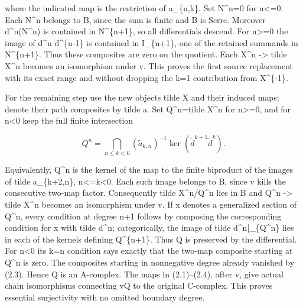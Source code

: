 where the indicated map is the restriction of a\_\allowbreak{}\{n,\allowbreak{}k\}. Set N\textasciicircum{}n\allowbreak{}=0 for n<\allowbreak{}=0. Each N\^{}n belongs to B,\allowbreak{} since the sum is finite and B is Serre. Moreover d\textasciicircum{}n(N\textasciicircum{}n)\allowbreak{} is contained in N\textasciicircum{}\{n\allowbreak{}+1\},\allowbreak{} so all differentials descend. For n>\allowbreak{}=0 the image of d\^{}n d\^{}\{n-1\} is contained in I\_\allowbreak{}\{n\allowbreak{}+1\},\allowbreak{} one of the retained summands in N\textasciicircum{}\{n\allowbreak{}+1\}. Thus these composites are zero on the quotient. Each X\^{}n \allowbreak{}-> tilde X\^{}n becomes an isomorphism under v. This proves the first source replacement with its exact range and without dropping the k\allowbreak{}=1 contribution from X\^{}\{-1\}.

For the remaining step use the new objects tilde X and their induced maps; denote their path composites by tilde a. Set Q\textasciicircum{}n\allowbreak{}=tilde X\^{}n for n>\allowbreak{}=0,\allowbreak{} and for n\textless0 keep the full finite intersection

\[
 Q^n=\bigcap_{n\le k<0}
       (\widetilde a_{k,n})^{-1}
       \ker(\widetilde d^{k+1}\widetilde d^k).             \tag{2.4}
\]

Equivalently,\allowbreak{} Q\^{}n is the kernel of the map to the finite biproduct of the images of tilde a\_\allowbreak{}\{k\allowbreak{}+2,\allowbreak{}n\},\allowbreak{} n<\allowbreak{}=k<0. Each such image belongs to B,\allowbreak{} since v kills the consecutive two-map factor. Consequently tilde X\textasciicircum{}n/\allowbreak{}Q\textasciicircum{}n lies in B and Q\^{}n \allowbreak{}-> tilde X\^{}n becomes an isomorphism under v. If x denotes a generalized section of Q\textasciicircum{}n,\allowbreak{} every condition at degree n\allowbreak{}+1 follows by composing the corresponding condition for x with tilde d\^{}n; categorically,\allowbreak{} the image of tilde d\textasciicircum{}n|\_\allowbreak{}\{Q\textasciicircum{}n\} lies in each of the kernels defining Q\textasciicircum{}\{n\allowbreak{}+1\}. Thus Q is preserved by the differential. For n\textless0 its k\allowbreak{}=n condition says exactly that the two-map composite starting at Q\^{}n is zero. The composites starting in nonnegative degree already vanished by (2.3)\allowbreak{}. Hence Q is an A-complex. The maps in (2.1)\allowbreak{}–\allowbreak{}(2.4)\allowbreak{},\allowbreak{} after v,\allowbreak{} give actual chain isomorphisms connecting vQ to the original C-complex. This proves essential surjectivity with no omitted boundary degree.

